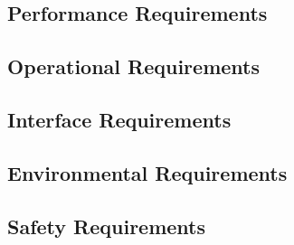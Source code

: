 

\clearpage

\subsection*{Performance Requirements}

\subsection*{Operational Requirements}

\subsection*{Interface Requirements}

\subsection*{Environmental Requirements}

\subsection*{Safety Requirements}

